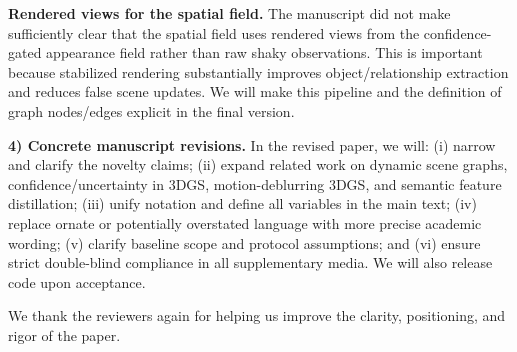 \documentclass[conference]{IEEEtran}
\begin{document}
\textbf{Rendered views for the spatial field.}
The manuscript did not make sufficiently clear that the spatial field uses rendered views from the confidence-gated appearance field rather than raw shaky observations. This is important because stabilized rendering substantially improves object/relationship extraction and reduces false scene updates. We will make this pipeline and the definition of graph nodes/edges explicit in the final version.

\textbf{4) Concrete manuscript revisions.}
In the revised paper, we will:
(i) narrow and clarify the novelty claims;
(ii) expand related work on dynamic scene graphs, confidence/uncertainty in 3DGS, motion-deblurring 3DGS, and semantic feature distillation;
(iii) unify notation and define all variables in the main text;
(iv) replace ornate or potentially overstated language with more precise academic wording;
(v) clarify baseline scope and protocol assumptions; and
(vi) ensure strict double-blind compliance in all supplementary media. We will also release code upon acceptance.

We thank the reviewers again for helping us improve the clarity, positioning, and rigor of the paper.
\end{document}

